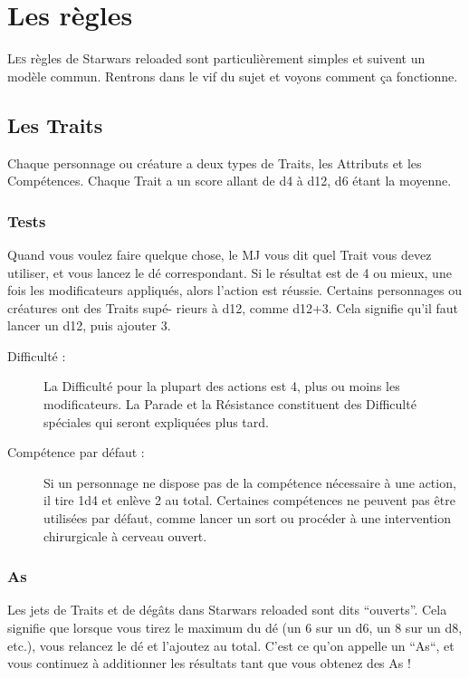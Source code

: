 
\section{Les règles}
\lettrine{L}{es} règles de {\jedifont Starwars reloaded} sont particulièrement simples et suivent un modèle commun. Rentrons dans le vif du sujet et voyons comment ça fonctionne.

\subsection{Les Traits}
Chaque personnage ou créature a deux types de Traits, les Attributs et les Compétences. Chaque Trait a un score allant de d4 à d12, d6 étant la moyenne.

\subsubsection{Tests}
Quand vous voulez faire quelque chose, le MJ vous dit quel Trait vous devez utiliser, et vous lancez le dé correspondant. Si le résultat est de 4 ou mieux, une fois les modificateurs appliqués, alors l’action est réussie. Certains personnages ou créatures ont des Traits supé- rieurs à d12, comme d12+3. Cela signifie qu’il faut lancer un d12, puis ajouter 3.

\begin{description}
\item[Difficulté :] La Difficulté pour la plupart des actions est 4, plus ou moins les modificateurs. La Parade et la Résistance constituent des Difficulté spéciales qui seront expliquées plus tard.

\item[Compétence par défaut :] Si un personnage ne dispose pas de la compétence nécessaire à une action, il tire 1d4 et enlève 2 au total. Certaines compétences ne peuvent pas être utilisées par défaut, comme lancer un sort ou procéder à une intervention chirurgicale à cerveau ouvert.
\end{description}

\subsubsection{As}
Les jets de Traits et de dégâts dans {\jedifont Starwars reloaded} sont dits “ouverts”. Cela signifie que lorsque vous tirez le maximum du dé (un 6 sur un d6, un 8 sur un d8, etc.), vous relancez le dé et l’ajoutez au total. C’est ce qu’on appelle un “As“, et vous continuez à additionner les résultats tant que vous obtenez des As !

